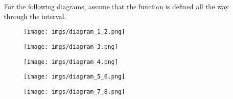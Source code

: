 \documentclass{article}
\begin{document}
For the following diagrams, assume that the function is defined all the way through the interval.
\begin{figure}[h]
    \centering
    \texttt{[image: imgs/diagram\_1\_2.png]}
\end{figure}
\begin{figure}[h]
    \centering
    \begin{minipage}{0.45\textwidth}
        \centering
        \texttt{[image: imgs/diagram\_3.png]}
    \end{minipage}\hfill
    \begin{minipage}{0.45\textwidth}
        \centering
        \texttt{[image: imgs/diagram\_4.png]}
    \end{minipage}
\end{figure}
\begin{figure}[h]
    \centering
    \texttt{[image: imgs/diagram\_5\_6.png]}
\end{figure}
\begin{figure}[h]
    \centering
    \texttt{[image: imgs/diagram\_7\_8.png]}
\end{figure}
\end{document}
